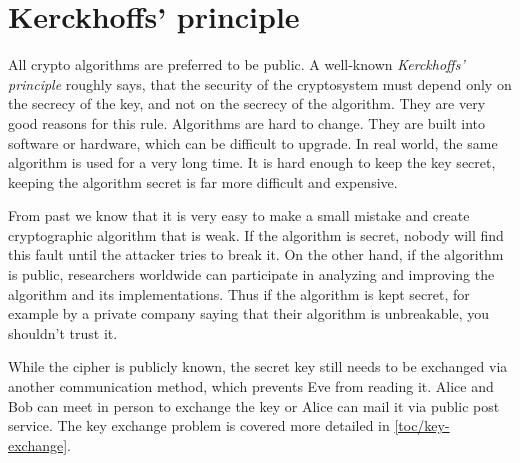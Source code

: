 \section{Kerckhoffs' principle}
\label{toc/kerckhoffs-principle}

All crypto algorithms are preferred to be public. A well-known \textit{Kerckhoffs' principle} roughly says, that the security of the cryptosystem must depend only on the secrecy of the key, and not on the secrecy of the algorithm. They are very good reasons for this rule. Algorithms are hard to change. They are built into software or hardware, which can be difficult to upgrade. In real world, the same algorithm is used for a very long time. It is hard enough to keep the key secret, keeping the algorithm secret is far more difficult and expensive.

From past we know that it is very easy to make a small mistake and create cryptographic algorithm that is weak. If the algorithm is secret, nobody will find this fault until the attacker tries to break it. On the other hand, if the algorithm is public, researchers worldwide can participate in analyzing and improving the algorithm and its implementations. Thus if the algorithm is kept secret, for example by a private company saying that their algorithm is unbreakable, you shouldn't trust it.

While the cipher is publicly known, the secret key still needs to be exchanged via another communication method, which prevents Eve from reading it. Alice and Bob can meet in person to exchange the key or Alice can mail it via public post service. The key exchange problem is covered more detailed in \autoref{toc/key-exchange}.
